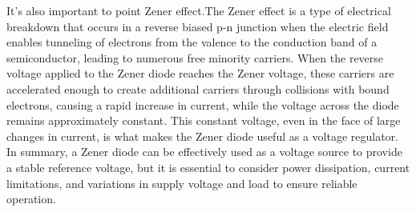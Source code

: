 \documentclass[11pt]{article}
\begin{document}
\begin{question}
{        It's also important to point Zener effect.The Zener effect is
        a type of electrical breakdown that occurs in a reverse biased
        p-n junction when the electric field enables tunneling of
        electrons from the valence to the conduction band of a
        semiconductor, leading to numerous free minority carriers.
        When the reverse voltage applied to the Zener diode reaches
        the Zener voltage, these carriers are accelerated enough to
        create additional carriers through collisions with bound
        electrons, causing a rapid increase in current, while the
        voltage across the diode remains approximately constant.
        This constant voltage,
        even in the face of large changes in current, is what makes the Zener
         diode useful as a voltage regulator. \\

        In summary, a Zener diode can be effectively used as a voltage source to
        provide a stable reference voltage,
        but it is essential to consider power dissipation, current limitations,
        and variations in supply voltage and load to ensure reliable operation.

    }

\end{question}
\end{document}
